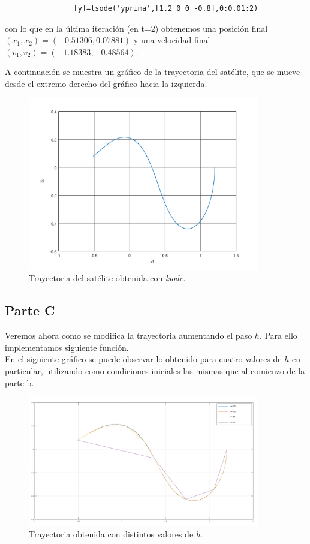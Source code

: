 \documentclass[titlepage,a4paper]{article}
\begin{document}
			\begin{lstlisting}
				[y]=lsode('yprima',[1.2 0 0 -0.8],0:0.01:2)			
			\end{lstlisting}
		con lo que en la última iteración (en t=2) obtenemos una posición final 
		$(x_{1}, x_{2}) = (-0.51306, 0.07881)$ y una velocidad final $(v_{1}, v_{2}) = (-1.18383, -0.48564)$.

		A continuación se muestra un gráfico de la trayectoria del satélite, que se mueve desde el extremo
		derecho del gráfico hacia la izquierda.
		\begin{figure}[H]
			\centering
			\includegraphics[width=0.9\textwidth]{parteb.png}
			\caption{\label{fig:parteb}Trayectoria del satélite obtenida con \emph{lsode}.}
		\end{figure}

	\subsection{Parte C}\label{sec:parteC}
	Veremos ahora como se modifica la trayectoria aumentando el paso $h$. Para ello implementamos siguiente función.\\

	

	En el siguiente gráfico se puede observar lo obtenido para cuatro valores  de $h$ en particular, utilizando como condiciones iniciales las mismas que al comienzo de la parte b.\\
	\begin{figure}[H]
		\centering
		\includegraphics[width=0.9\textwidth]{partec.png}
		\caption{\label{fig:partec}Trayectoria obtenida con distintos valores de \emph{h}.}
	\end{figure}
\end{document}
